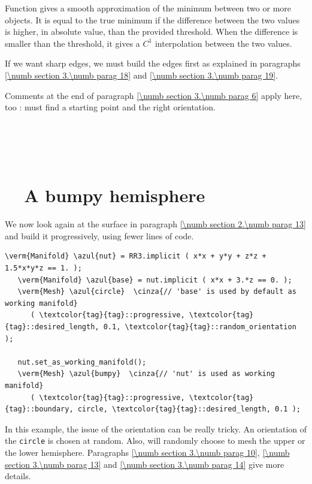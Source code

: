 Function {\small\tt {}} gives a smooth approximation of the minimum between
two or more {\small\tt {}} objects.
It is equal to the true minimum if the difference between the two values is higher, in
absolute value, than the provided threshold.
When the difference is smaller than the threshold, it gives a $ C^1 $ interpolation between
the two values.

If we want sharp edges, we must build the edges first as explained in paragraphs
\ref{\numb section 3.\numb parag 18} and \ref{\numb section 3.\numb parag 19}.

Comments at the end of paragraph \ref{\numb section 3.\numb parag 6} apply here, too :
{\maniFEM} must find a starting point and the right orientation.


\section{~~\cinza{[empty]}}\label{\numb section 3.\numb parag 8}


\section{~~A bumpy hemisphere}\label{\numb section 3.\numb parag 9}

We now look again at the surface in paragraph \ref{\numb section 2.\numb parag 13}
and build it progressively, using fewer lines of code.

\begin{Verbatim}[commandchars=\\\{\},formatcom=\small\tt,
   baselinestretch=0.94,framesep=2mm                      ]
   \verm{Manifold} \azul{nut} = RR3.implicit ( x*x + y*y + z*z + 1.5*x*y*z == 1. );
   \verm{Manifold} \azul{base} = nut.implicit ( x*x + 3.*z == 0. );
   \verm{Mesh} \azul{circle}  \cinza{// 'base' is used by default as working manifold}
      ( \textcolor{tag}{tag}::progressive, \textcolor{tag}{tag}::desired_length, 0.1, \textcolor{tag}{tag}::random_orientation );
   
   nut.set_as_working_manifold();
   \verm{Mesh} \azul{bumpy}  \cinza{// 'nut' is used as working manifold}
      ( \textcolor{tag}{tag}::progressive, \textcolor{tag}{tag}::boundary, circle, \textcolor{tag}{tag}::desired_length, 0.1 );
\end{Verbatim}

In this example, the issue of the orientation can be really tricky.
An orientation of the {\small\tt circle} is chosen at random.
Also, {\maniFEM} will randomly choose to mesh the upper or the lower hemisphere.
Paragraphs \ref{\numb section 3.\numb parag 10}, \ref{\numb section 3.\numb parag 13} and
\ref{\numb section 3.\numb parag 14} give more details.


